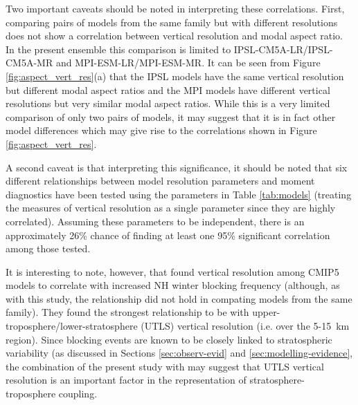 Two important caveats should be noted in interpreting these correlations. First,
comparing pairs of models from the same family but with different resolutions
does not show a correlation between vertical resolution and modal aspect
ratio. In the present ensemble this comparison is limited to
IPSL-CM5A-LR/IPSL-CM5A-MR and MPI-ESM-LR/MPI-ESM-MR. It can be seen from Figure
\ref{fig:aspect_vert_res}(a) that the IPSL models have the same vertical
resolution but different modal aspect ratios and the MPI models have different
vertical resolutions but very similar modal aspect ratios. While this is a very
limited comparison of only two pairs of models, it may suggest that it is in
fact other model differences which may give rise to the correlations shown in
Figure \ref{fig:aspect_vert_res}.

A second caveat is that interpreting this significance, it should be noted that
six different relationships between model resolution parameters and moment
diagnostics have been tested using the parameters in Table \ref{tab:models}
(treating the measures of vertical resolution as a single parameter since they
are highly correlated). Assuming these parameters to be independent, there is an
approximately 26\% chance of finding at least one 95\% significant correlation
among those tested. 

It is interesting to note, however, that \citet{Anstey2013} found vertical
resolution among CMIP5 models to correlate with increased NH winter blocking
frequency (although, as with this study, the relationship did not hold in
compating models from the same family). They found the strongest relationship to
be with upper-troposphere/lower-stratosphere (UTLS) vertical resolution
(i.e. over the 5-15~km region). Since blocking events are known to be closely
linked to stratospheric variability (as discussed in Sections
\ref{sec:observ-evid} and \ref{sec:modelling-evidence}, the combination of the
present study with \citet{Anstey2013} may suggest that UTLS vertical resolution
is an important factor in the representation of stratosphere-troposphere
coupling.

